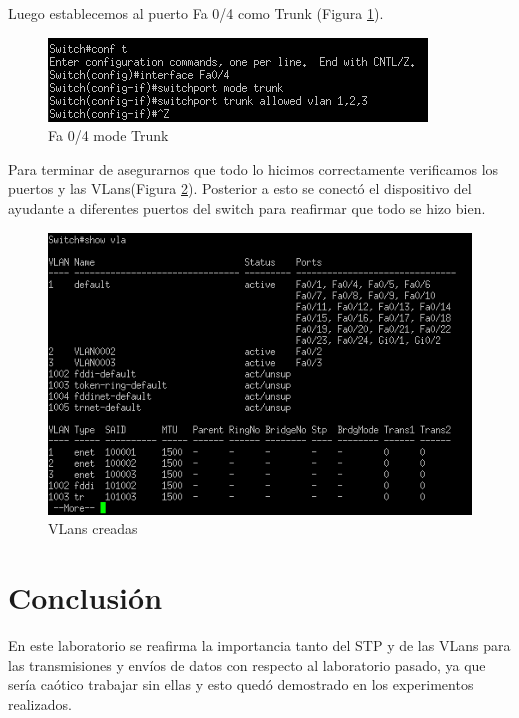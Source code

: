 \documentclass{article}
\begin{document}
\newline Luego establecemos al puerto Fa 0/4 como Trunk (Figura \ref{fig:SpTrunk}).

\begin{figure}[h!]
\centering
\includegraphics[scale=0.6]{8_vlantrunk4.png}
\caption{Fa 0/4 mode Trunk}
\label{fig:SpTrunk}
\end{figure}

Para terminar de asegurarnos que todo lo hicimos correctamente verificamos los puertos y las VLans(Figura \ref{fig:vlancr}). Posterior a esto se conectó el dispositivo del ayudante a diferentes puertos del switch para reafirmar que todo se hizo bien.
\begin{figure}[h!]
\centering
\includegraphics[scale=0.45]{9_vlancreadas.png}
\caption{VLans creadas}
\label{fig:vlancr}
\end{figure}


\newpage
\section{Conclusión\vspace{0.5cm}}
En este laboratorio se reafirma la importancia tanto del STP y de las VLans para las transmisiones y envíos de datos con respecto al laboratorio pasado, ya que sería caótico trabajar sin ellas y esto quedó demostrado en los experimentos realizados.
\end{document}
